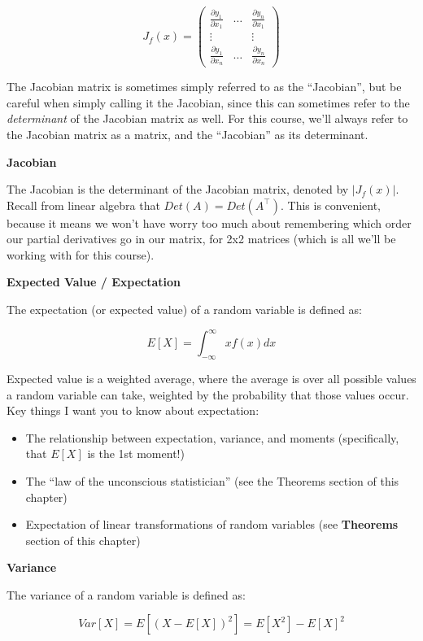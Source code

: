 \documentclass[
  letterpaper,
  DIV=11,
  numbers=noendperiod]{scrreprt}
\begin{document}
\[
J_f(x) = \begin{pmatrix}
\frac{\partial y_1}{\partial x_1} & \dots & \frac{\partial y_n}{\partial x_1} \\
\vdots & & \vdots \\
\frac{\partial y_1}{\partial x_n} & \dots & \frac{\partial y_n}{\partial x_n}
\end{pmatrix}
\]

The Jacobian matrix is sometimes simply referred to as the ``Jacobian'',
but be careful when simply calling it the Jacobian, since this can
sometimes refer to the \emph{determinant} of the Jacobian matrix as
well. For this course, we'll always refer to the Jacobian matrix as a
matrix, and the ``Jacobian'' as its determinant.

\textbf{Jacobian}

The Jacobian is the determinant of the Jacobian matrix, denoted by
\(| J_f(x) |\). Recall from linear algebra that
\(Det(A) = Det(A^\top)\). This is convenient, because it means we won't
have worry too much about remembering which order our partial
derivatives go in our matrix, for 2x2 matrices (which is all we'll be
working with for this course).

\textbf{Expected Value / Expectation}

The expectation (or expected value) of a random variable is defined as:

\[
E[X] = \int_{-\infty}^\infty x f(x) dx
\]

Expected value is a weighted average, where the average is over all
possible values a random variable can take, weighted by the probability
that those values occur. Key things I want you to know about
expectation:

\begin{itemize}
\item
  The relationship between expectation, variance, and moments
  (specifically, that \(E[X]\) is the 1st moment!)
\item
  The ``law of the unconscious statistician'' (see the Theorems section
  of this chapter)
\item
  Expectation of linear transformations of random variables (see
  \textbf{Theorems} section of this chapter)
\end{itemize}

\textbf{Variance}

The variance of a random variable is defined as:

\[
Var[X] = E[(X - E[X])^2] = E[X^2] - E[X]^2
\]
\end{document}
